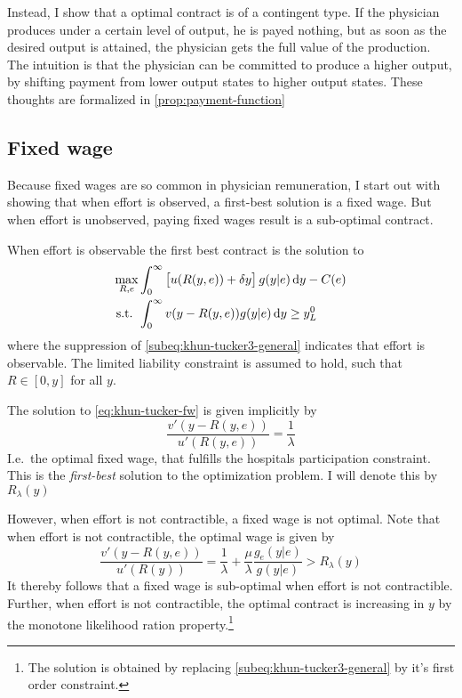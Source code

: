 Instead, I show that a optimal contract is of a contingent type. If the physician produces under a certain level of output, he is payed nothing, but as soon as the desired output is attained, the physician gets the full value of the production. The intuition is that the physician can be committed to produce a higher output, by shifting payment from lower output states to higher output states. These thoughts are formalized in \cref{prop:payment-function}

\subsection{Fixed wage} %
\label{sub:fixed_wage}
Because fixed wages are so common in physician remuneration, I start out with showing that when effort is observed, a first-best solution is a fixed wage. But when effort is unobserved, paying fixed wages result is a sub-optimal contract. 

When effort is observable the first best contract is the solution to 
\begin{subequations}
\label{eq:khun-tucker-fw}
\begin{align}
    \max_{R,e} & \int_0^{\infty}\left[u(R(y,e))+\delta y\right]g(y|e)\dif y-C(e) \\
    \text{s.t. }    & \int_{0}^{\infty} v(y-R(y,e))g(y|e)\dif y\geq y_L^0
\end{align}
\end{subequations}
where the suppression of \cref{subeq:khun-tucker3-general} indicates that effort is observable. The limited liability constraint is assumed to hold, such that  $R\in[0,y]$ for all $y$. 

The solution to \cref{eq:khun-tucker-fw} is given implicitly by 
\[
    \frac{v'(y-R(y,e))}{u'(R(y,e))}=\frac{1}{\lambda}
\]
I.e.\ the optimal fixed wage, that fulfills the hospitals participation constraint. This is the \emph{first-best} solution to the optimization problem. I will denote this by $R_\lambda(y)$

However, when effort is not contractible, a fixed wage is not optimal. Note that when effort is not contractible, the optimal wage is given by 
\[
    \frac{v'(y-R(y,e))}{u'(R(y))}=\frac{1}{\lambda}+\frac{\mu}{\lambda}\frac{g_e(y|e)}{g(y|e)}>R_\lambda(y)
\]
It thereby follows that a fixed wage is sub-optimal when effort is not contractible. Further, when effort is not contractible, the optimal contract is increasing in $y$ by the monotone likelihood ration property.\footnote{The solution is obtained by replacing \cref{subeq:khun-tucker3-general} by it's first order constraint.}

